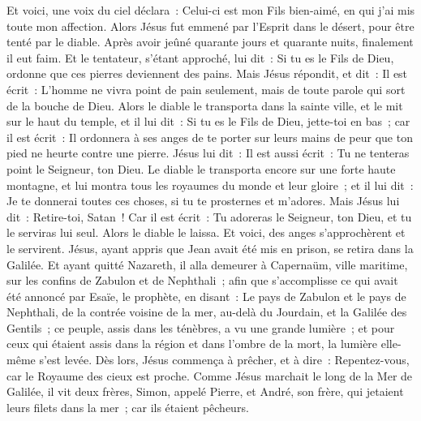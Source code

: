 \begin{multicols}{2}
Et voici, une voix du ciel déclara~: Celui-ci est mon Fils bien-aimé, en qui j'ai mis toute mon affection.
\VerseOne{}Alors Jésus fut emmené par l'Esprit dans le désert, pour être tenté par le diable.
Après avoir jeûné quarante jours et quarante nuits, finalement il eut faim.
Et le tentateur, s'étant approché, lui dit~: Si tu es le Fils de Dieu, ordonne que ces pierres deviennent des pains.
Mais Jésus répondit, et dit~: Il est écrit~: L'homme ne vivra point de pain seulement, mais de toute parole qui sort de la bouche de Dieu.
Alors le diable le transporta dans la sainte ville, et le mit sur le haut du temple,
et il lui dit~: Si tu es le Fils de Dieu, jette-toi en bas~; car il est écrit~: Il ordonnera à ses anges de te porter sur leurs mains de peur que ton pied ne heurte contre une pierre.
Jésus lui dit~: Il est aussi écrit~: Tu ne tenteras point le Seigneur, ton Dieu.
Le diable le transporta encore sur une forte haute montagne, et lui montra tous les royaumes du monde et leur gloire~;
et il lui dit~: Je te donnerai toutes ces choses, si tu te prosternes et m'adores.
Mais Jésus lui dit~: Retire-toi, Satan~! Car il est écrit~: Tu adoreras le Seigneur, ton Dieu, et tu le serviras lui seul.
Alors le diable le laissa. Et voici, des anges s'approchèrent et le servirent.
Jésus, ayant appris que Jean avait été mis en prison, se retira dans la Galilée.
Et ayant quitté Nazareth, il alla demeurer à Capernaüm, ville maritime, sur les confins de Zabulon et de Nephthali~;
afin que s'accomplisse ce qui avait été annoncé par Esaïe, le prophète, en disant~:
Le pays de Zabulon et le pays de Nephthali, de la contrée voisine de la mer, au-delà du Jourdain, et la Galilée des Gentils~;
ce peuple, assis dans les ténèbres, a vu une grande lumière~; et pour ceux qui étaient assis dans la région et dans l'ombre de la mort, la lumière elle-même s'est levée.
Dès lors, Jésus commença à prêcher, et à dire~: Repentez-vous, car le Royaume des cieux est proche.
Comme Jésus marchait le long de la Mer de Galilée, il vit deux frères, Simon, appelé Pierre, et André, son frère, qui jetaient leurs filets dans la mer~; car ils étaient pêcheurs.

\end{multicols}

